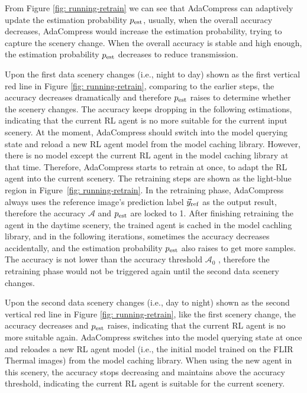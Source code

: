 From Figure \ref{fig: running-retrain} we can see that AdaCompress can adaptively update the estimation probability $ p_{\rm est} $, usually, when the overall accuracy decreases, AdaCompress would increase the estimation probability, trying to capture the scenery change. When the overall accuracy is stable and high enough, the estimation probability $ p_{\rm est} $ decreases to reduce transmission. %

Upon the first data scenery changes (i.e., night to day) shown as the first vertical red line in Figure \ref{fig: running-retrain}, comparing to the earlier steps, the accuracy decreases dramatically and therefore $ p_{\rm est} $ raises to determine whether the scenery changes. The accuracy keeps dropping in the following estimations, indicating that the current RL agent is no more suitable for the current input scenery. At the moment, AdaCompress should switch into the model querying state and reload a new RL agent model from the model caching library. However, there is no model except the current RL agent in the model caching library at that time. Therefore, AdaCompress starts to retrain at once, to adapt the RL agent into the current scenery. The retraining steps are shown as the light-blue region in Figure~\ref{fig: running-retrain}. In the retraining phase, AdaCompress always uses the reference image's prediction label $ \vec{y}_{\rm ref} $ as the output result, therefore the accuracy $ \mathcal{A} $ and $ p_{\rm est} $ are locked to 1. After finishing retraining the agent in the daytime scenery, the trained agent is cached in the model cachling library, and in the following iterations, sometimes the accuracy decreases accidentally, and the estimation probability $ p_{\rm est} $ also raises to get more samples. The accuracy is not lower than the accuracy threshold $ \mathcal{A}_0 $ , therefore the retraining phase would not be triggered again until the second data scenery changes. %

Upon the second data scenery changes (i.e., day to night) shown as the second vertical red line in Figure \ref{fig: running-retrain}, like the first scenery change, the accuracy decreases and $ p_{\rm est} $ raises, indicating that the current RL agent is no more suitable again. AdaCompress switches into the model querying state at once and reloades a new RL agent model (i.e., the initial model trained on the FLIR Thermal images) from the model caching library. When using the new agent in this scenery, the accuracy stops decreasing and maintains above the accuracy threshold, indicating the current RL agent is suitable for the current scenery.  %

